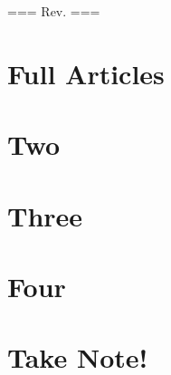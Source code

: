 \documentclass[12pt]{book}
\begin{document}
\noindent
=== Rev. \rev ===

\newpage


\part{Full Articles}

\part{Two}

\part{Three}

\part{Four}

\part{Take Note!}


\end{document}
